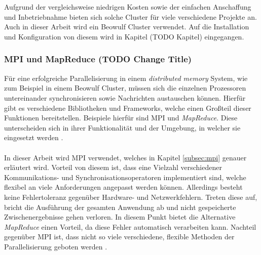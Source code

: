 \\\\
Aufgrund der vergleichsweise niedrigen Kosten sowie der einfachen Anschaffung und Inbetriebnahme bieten sich solche Cluster für viele verschiedene Projekte an. Auch in dieser Arbeit wird ein Beowulf Cluster verwendet. Auf die Installation und Konfiguration von diesem wird in Kapitel (TODO Kapitel) eingegangen.

\subsubsection{MPI und MapReduce (TODO Change Title)}
\label{subsubsec:mpi_and_mapreduce}
Für eine erfolgreiche Parallelisierung in einem \emph{distributed memory} System, wie zum Beispiel in einem Beowulf Cluster, müssen sich die einzelnen Prozessoren untereinander synchronisieren sowie Nachrichten austauschen können. Hierfür gibt es verschiedene Bibliotheken und Frameworks, welche einen Großteil dieser Funktionen bereitstellen. Beispiele hierfür sind \ac{MPI} und \emph{MapReduce}. Diese unterscheiden sich in ihrer Funktionalität und der Umgebung, in welcher sie eingesetzt werden \cite{nielsen2016introduction}.
\\\\
In dieser Arbeit wird \ac{MPI} verwendet, welches in Kapitel \ref{subsec:mpi} genauer erläutert wird. Vorteil von diesem ist, dass eine Vielzahl verschiedener Kommunikations- und Synchronisationsoperatoren implementiert sind, welche flexibel an viele Anforderungen angepasst werden können. Allerdings besteht keine Fehlertoleranz gegenüber Hardware- und Netzwerkfehlern. Treten diese auf, bricht die Ausführung der gesamten Anwendung ab und nicht gespeicherte Zwischenergebnisse gehen verloren. In diesem Punkt bietet die Alternative \emph{MapReduce} einen Vorteil, da diese Fehler automatisch verarbeiten kann. Nachteil gegenüber \ac{MPI} ist, dass nicht so viele verschiedene, flexible Methoden der Parallelisierung geboten werden \cite{nielsen2016introduction}.

